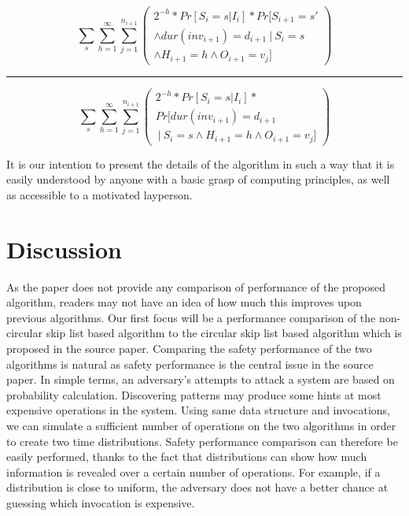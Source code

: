\documentclass[11pt,twocolumn]{article}
\begin{document}
\begin{minipage}{.5\textwidth}

$$\sum_s\sum_{h=1}^\infty\sum_{j=1}^{n_{i+1}} \left( \begin{matrix}
2^{-h}*Pr[S_i=s | I_i]*Pr[S_{i+1}=s' \\ \land dur(inv_{i+1})=d_{i+1}\  
|\  S_i=s \\ \land H_{i+1}=h \land O_{i+1}=v_j] \end{matrix} \right)$$
\hrule
$$\sum_s\sum_{h=1}^\infty\sum_{j=1}^{n_{i+1}} 
\left( \begin{matrix}2^{-h}*Pr[S_i=s | I_i]*
\\Pr[ dur(inv_{i+1})=d_{i+1} \\ \  | \  S_i=s \land H_{i+1}=h \land O_{i+1}=v_j] \end{matrix} \right)$$

\end{minipage}

It is our intention to present the details of the algorithm in such a way that
it is easily understood by anyone with a basic grasp of computing principles,
as well as accessible to a motivated layperson.


\section{Discussion}

As the paper does not provide any comparison of performance of the proposed algorithm, readers may not have an idea of how much this improves upon previous algorithms. Our first focus will be a performance comparison of the non-circular skip list based algorithm to the circular skip list based algorithm which is proposed in the source paper. Comparing the safety performance of the two algorithms is natural as safety performance is the central issue in the source paper. In simple terms, an adversary's attempts to attack a system are based on probability calculation. Discovering patterns may produce some hints at most expensive operations in the system. Using same data structure and invocations, we can simulate a sufficient number of operations on the two algorithms in order to create two time distributions. Safety performance comparison can therefore be easily performed, thanks to the fact that distributions can show how much information is revealed over a certain number of operations. For example, if a distribution is close to uniform, the adversary does not have a better chance at guessing which invocation is expensive. 
\end{document}
